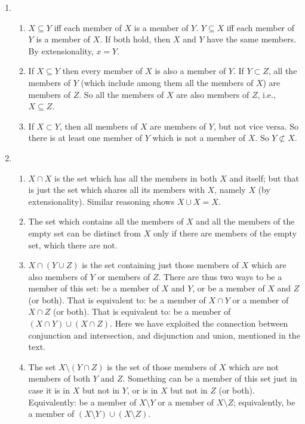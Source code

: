 \begin{enumerate}
	\item \begin{enumerate}
		\item $X\subseteq Y$ iff each member of $X$ is a member of $Y$. $Y \subseteq X$ iff each member of $Y$ is a member of $X$. If both hold, then $X$ and $Y$ have the same members. By extensionality, $x=Y$.  
		\item If $X\subseteq Y$ then every member of $X$ is also a member of $Y$. If $Y \subset Z$, all the members of $Y$ (which include among them all the members of $X$) are members of $Z$. So all the members of $X$ are also members of $Z$, i.e., $X\subseteq Z$. \setcounter{enumii}{3}
		\item If $X \subset Y$, then all members of $X$ are members of $Y$, but not vice versa. So there is at least one member of $Y$ which is not a member of $X$. So $Y\not\subset X$. 
	\end{enumerate}
	\item \begin{enumerate}
		\item $X\cap X$ is the set which has all the members in both $X$ and itself; but that is just the set which shares all its members with $X$, namely $X$ (by extensionality). Similar reasoning shows $X\cup X = X$. \setcounter{enumii}{2}
	\item The set which contains all the members of $X$ and all the members of the empty set can be distinct from $X$ only if there are members of the empty set, which there are not. \setcounter{enumii}{4}
	\item $X\cap(Y \cup Z)$ is the set containing just those members of $X$ which are also members of $Y$ or members of $Z$. There are thus two ways to be a member of this set: be a member of $X$ and  $Y$, or be a member of $X$ and $Z$ (or both). That is equivalent to: be a member of $X \cap Y$ or a member of $X \cap Z$ (or both). That is equivalent to: be a member of $(X\cap Y)\cup(X\cap Z)$. Here we have exploited the connection between conjunction and intersection, and disjunction and union, mentioned in the text. \setcounter{enumii}{6}
	\item The set $X \setminus (Y \cap Z)$ is the set of those members of $X$ which are not members of both $Y$ and $Z$. Something can be a member of this set just in case it is in $X$ but not in $Y$, or is in $X$ but not in $Z$ (or both). Equivalently: be a member of $X \setminus Y$ or a member of $X\setminus Z$; equivalently, be a member of $(X \setminus Y) \cup (X\setminus Z)$.

\end{enumerate}
\end{enumerate}
